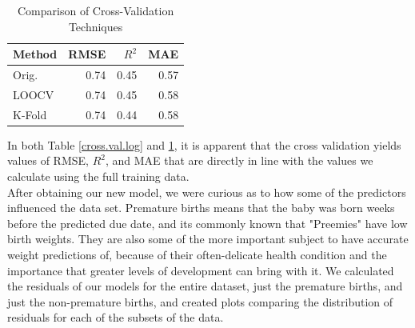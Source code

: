 \documentclass{article}\usepackage[]{graphicx}\usepackage[]{xcolor}
\begin{document}
\begin{table}[H]
\centering
\begin{tabular}{lrrr}
  \hline
 Method & RMSE & $R^2$ & MAE \\ 
  \hline
  Orig. & 0.74 & 0.45 & 0.57 \\
LOOCV & 0.74 & 0.45 & 0.58 \\ 
  K-Fold & 0.74 & 0.44 & 0.58 \\ 
   \hline
\end{tabular}
\caption{Comparison of Cross-Validation Techniques} 
\label{cross.val.un}
\end{table}

In both Table \ref{cross.val.log} and \ref{cross.val.un}, it is apparent that the cross validation yields values of RMSE, $R^2$, and MAE that are directly in line with the values we calculate using the full training data. \\

After obtaining our new model, we were curious as to how some of the predictors influenced the data set. Premature births means that the baby was born weeks before the predicted due date, and its commonly known that "Preemies" have low birth weights. They are also some of the more important subject to have accurate weight predictions of, because of their often-delicate health condition and the importance that greater levels of development can bring with it. We calculated the residuals of our models for the entire dataset, just the premature births, and just the non-premature births, and created plots comparing the distribution of residuals for each of the subsets of the data. 
\end{document}
